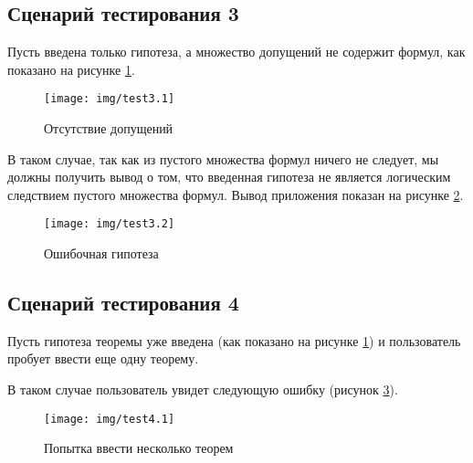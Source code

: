 \documentclass[12pt, a4paper]{article}
\begin{document}
	  \begin{center}
	 	\subsection{Сценарий тестирования 3}
	 \end{center} 
	 \par Пусть введена только гипотеза, а множество допущений не содержит формул, как показано на рисунке \ref{fig:test3.1}.
	 \begin{figure}[h!]
	 	\centering
	 	\texttt{[image: img/test3.1]}
	 	\caption{Отсутствие допущений}
	 	\label{fig:test3.1}
	 \end{figure}
	 \par В таком случае, так как из пустого множества формул ничего не следует, мы должны получить вывод о том, что введенная гипотеза не является логическим следствием пустого множества формул. Вывод приложения показан на рисунке \ref{fig:test3.2}.
	  \begin{figure}[h!]
	 	\centering
	 	\texttt{[image: img/test3.2]}
	 	\caption{Ошибочная гипотеза}
	 	\label{fig:test3.2}
	 \end{figure}
	 \newpage
	 \begin{center}
	 	\subsection{Сценарий тестирования 4}
	 \end{center} 
	 \par Пусть гипотеза теоремы уже введена (как показано на рисунке \ref{fig:test3.1}) и пользователь пробует ввести еще одну теорему. 
	 \par В таком случае пользователь увидет следующую ошибку (рисунок \ref{fig:test4.1}).
	 \begin{figure}[h!]
	 	\centering
	 	\texttt{[image: img/test4.1]}
	 	\caption{Попытка ввести несколько теорем}
	 	\label{fig:test4.1}
	 \end{figure}
	 
\end{document}
